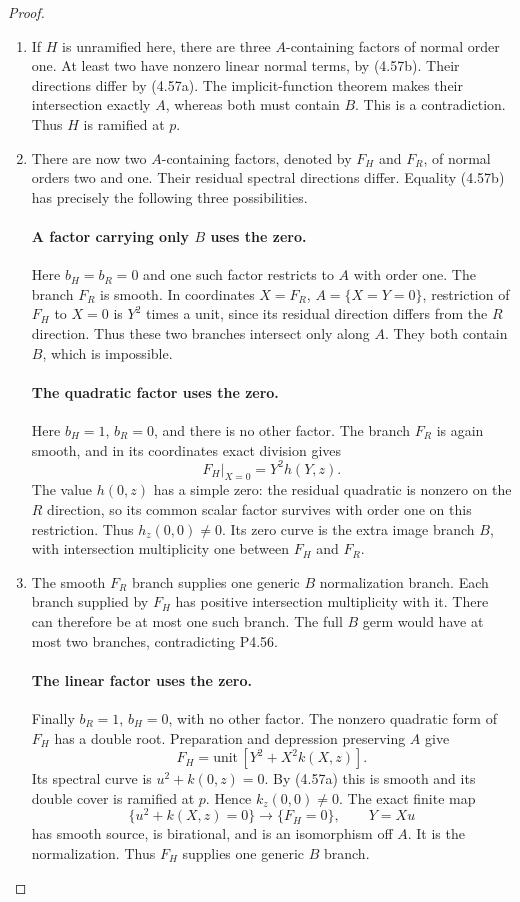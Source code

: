 \begin{proof}
\begin{enumerate}[label={$\langle1\rangle$\arabic*.},leftmargin=*]
\item If $H$ is unramified here, there are three
$A$-containing factors of normal order one. At least
two have nonzero linear normal terms, by (4.57b).
Their directions differ by (4.57a). The implicit-function
theorem makes their intersection exactly $A$, whereas
both must contain $B$. This is a contradiction.
Thus $H$ is ramified at $p$.

\item There are now two $A$-containing factors, denoted by
$F_H$ and $F_R$, of normal orders two and one. Their
residual spectral directions differ. Equality (4.57b)
has precisely the following three possibilities.

\paragraph{A factor carrying only $B$ uses the zero.}
Here $b_H=b_R=0$ and one such factor restricts to $A$
with order one. The branch $F_R$ is smooth. In coordinates
$X=F_R$, $A=\{X=Y=0\}$, restriction of $F_H$ to $X=0$
is $Y^2$ times a unit, since its residual direction
differs from the $R$ direction. Thus these two branches
intersect only along $A$. They both contain $B$, which
is impossible.

\paragraph{The quadratic factor uses the zero.}
Here $b_H=1$, $b_R=0$, and there is no other factor.
The branch $F_R$ is again smooth, and in its coordinates
exact division gives
\[
                         F_H|_{X=0}=Y^2h(Y,z).
\]
The value $h(0,z)$ has a simple zero: the residual
quadratic is nonzero on the $R$ direction, so its
common scalar factor survives with order one on this
restriction. Thus $h_z(0,0)\ne0$. Its zero curve is the
extra image branch $B$, with intersection multiplicity
one between $F_H$ and $F_R$.

\item The smooth $F_R$ branch supplies one generic $B$
normalization branch. Each branch supplied by $F_H$
has positive intersection multiplicity with it. There
can therefore be at most one such branch. The full
$B$ germ would have at most two branches, contradicting
P4.56.

\paragraph{The linear factor uses the zero.}
Finally $b_R=1$, $b_H=0$, with no other factor.
The nonzero quadratic form of $F_H$ has a double root.
Preparation and depression preserving $A$ give
\[
                   F_H=\text{unit}\,[Y^2+X^2k(X,z)].
\]
Its spectral curve is $u^2+k(0,z)=0$. By (4.57a) this
is smooth and its double cover is ramified at $p$.
Hence $k_z(0,0)\ne0$. The exact finite map
\[
 \{u^2+k(X,z)=0\}\longrightarrow\{F_H=0\},
                         \qquad Y=Xu
\]
has smooth source, is birational, and is an isomorphism
off $A$. It is the normalization. Thus $F_H$ supplies
one generic $B$ branch.


\end{enumerate}
\end{proof}
